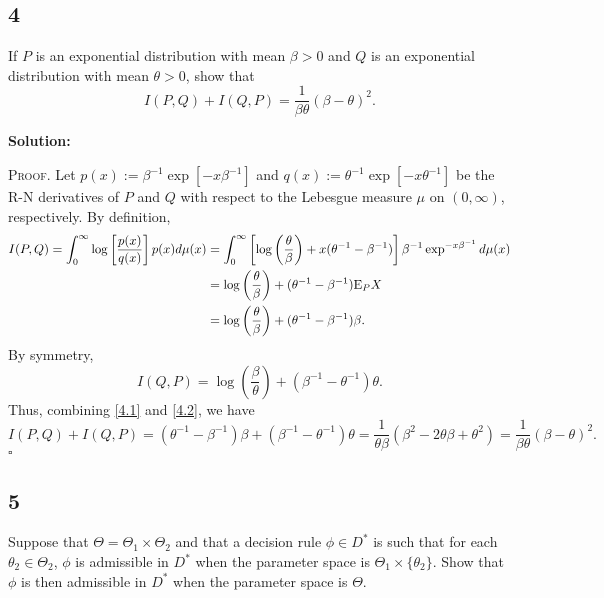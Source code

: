 \documentclass[12pt]{article}
\newcounter{ProofCounter}
\newenvironment{Proof}{\stepcounter{ProofCounter}\textsc{Proof.}}{\hfill$\square$}
\begin{document}
\newpage
\subsection*{4}
\begin{tcolorbox}
  If $P$ is an exponential distribution with mean $\beta>0$ and $Q$ is an exponential distribution with mean $\theta>0$, show that
  \[
    I(P,Q)+I(Q,P) = \frac{1}{\beta \theta} (\beta-\theta)^2.
  \]
\end{tcolorbox}

\textbf{Solution:}

\begin{Proof}
  Let $p(x) := \beta^{-1}\exp\left[ -x\beta^{-1} \right]$ and $q(x) := \theta^{-1}\exp\left[ -x\theta^{-1} \right]$ be the R-N derivatives of $P$ and
  $Q$ with respect to the Lebesgue measure $\mu$ on $(0,\infty)$, respectively. By definition,
  \begin{align}
    I(P,Q) = \int_{0}^{\infty}\log\left[ \frac{p(x)}{q(x)} \right]p(x)d\mu(x) & = \int_{0}^{\infty}\left[ \log\left( \frac{\theta}{\beta}\right) + 
    x(\theta^{-1} - \beta^{-1}) \right]\beta^{-1}\exp^{-x\beta^{-1}}d\mu(x) \nonumber \\
    & = \log\left( \frac{\theta}{\beta} \right) + (\theta^{-1} - \beta^{-1})\mathrm{E}_{P}X \nonumber \\
    & = \log\left( \frac{\theta}{\beta} \right) + (\theta^{-1} - \beta^{-1})\beta. \label{4.1}
  \end{align}
  By symmetry,
  \begin{equation}
    I(Q,P) = \log\left( \frac{\beta}{\theta} \right) + (\beta^{-1} - \theta^{-1})\theta.
    \label{4.2}
  \end{equation}
  Thus, combining \eqref{4.1} and \eqref{4.2}, we have 
  \[ 
    I(P,Q) + I(Q,P) = (\theta^{-1} - \beta^{-1})\beta + (\beta^{-1} - \theta^{-1})\theta = \frac{1}{\theta\beta}(\beta^{2} - 2\theta\beta +
    \theta^{2}) = \frac{1}{\beta\theta}(\beta - \theta)^{2}.
  \]
\end{Proof}



\subsection*{5}
\begin{tcolorbox}
  Suppose that $\Theta = \Theta_1 \times \Theta_2$ and that a decision rule $\phi \in D^*$ is such that for each $\theta_2\in\Theta_2$, $\phi$
  is admissible in $D^*$ when the parameter space is $\Theta_1\times \{\theta_2\}$.  Show that $\phi$ is then admissible in $D^*$ when the parameter space is $\Theta$.
\end{tcolorbox}
\end{document}
